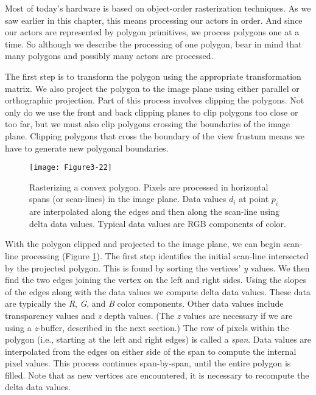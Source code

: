 Most of today's hardware is based on object-order rasterization techniques. As we saw earlier in this chapter, this means processing our actors in order. And since our actors are represented by polygon primitives, we process polygons one at a time. So although we describe the processing of one polygon, bear in mind that many polygons and possibly many actors are processed.

The first step is to transform the polygon using the appropriate transformation matrix. We also project the polygon to the image plane using either parallel or orthographic projection. Part of this process involves clipping the polygons. Not only do we use the front and back clipping planes to clip polygons too close or too far, but we must also clip polygons crossing the boundaries of the image plane. Clipping polygons that cross the boundary of the view frustum means we have to generate new polygonal boundaries.

\begin{figure}[!htb]
  \centering
  \texttt{[image: Figure3-22]}\\
  \caption{Rasterizing a convex polygon. Pixels are processed in horizontal spans (or scan-lines) in the image plane. Data values $d_i$ at point $p_i$ are interpolated along the edges and then along the scan-line using delta data values. Typical data values are RGB components of color.}\label{fig:Figure3-22}
\end{figure}

With the polygon clipped and projected to the image plane, we can begin scan-line processing (Figure \ref{fig:Figure3-22}). The first step identifies the initial scan-line intersected by the projected polygon. This is found by sorting the vertices' \emph{y} values. We then find the two edges joining the vertex on the left and right sides. Using the slopes of the edges along with the data values we compute delta data values. These data are typically the \emph{R}, \emph{G}, and \emph{B} color components. Other data values include transparency values and \emph{z} depth values. (The \emph{z} values are necessary if we are using a \emph{z}-buffer, described in the next section.) The row of pixels within the polygon (i.e., starting at the left and right edges) is called a \emph{span}. Data values are interpolated from the edges on either side of the span to compute the internal pixel values. This process continues span-by-span, until the entire polygon is filled. Note that as new vertices are encountered, it is necessary to recompute the delta data values.


